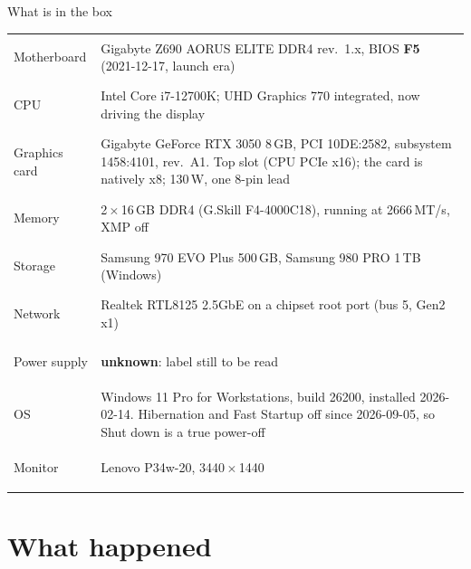\documentclass[aspectratio=169,11pt]{beamer}
\begin{document}
\begin{frame}{What is in the box}
  \footnotesize
  \renewcommand{\arraystretch}{1.08}
  \begin{tabularx}{\textwidth}{@{}>{\bfseries\raggedright}p{2.6cm}L@{}}
    \toprule
    Motherboard & Gigabyte Z690 AORUS ELITE DDR4 rev.\ 1.x, BIOS \textbf{F5} (2021-12-17, launch era) \\
    CPU & Intel Core i7-12700K; UHD Graphics 770 integrated, now driving the display \\
    Graphics card & Gigabyte GeForce RTX 3050 8\,GB, PCI 10DE:2582, subsystem 1458:4101, rev.\ A1.
      Top slot (CPU PCIe x16); the card is natively x8; 130\,W, one 8-pin lead \\
    Memory & 2\,$\times$\,16\,GB DDR4 (G.Skill F4-4000C18), running at 2666\,MT/s, XMP off \\
    Storage & Samsung 970 EVO Plus 500\,GB, Samsung 980 PRO 1\,TB (Windows) \\
    Network & Realtek RTL8125 2.5GbE on a chipset root port (bus 5, Gen2 x1) \\
    Power supply & \textbf{unknown}: label still to be read \\
    OS & Windows 11 Pro for Workstations, build 26200, installed 2026-02-14.
      Hibernation and Fast Startup off since 2026-09-05, so Shut down is a true power-off \\
    Monitor & Lenovo P34w-20, 3440\,$\times$\,1440 \\
    \bottomrule
  \end{tabularx}
\end{frame}

\section{What happened}
\end{document}
